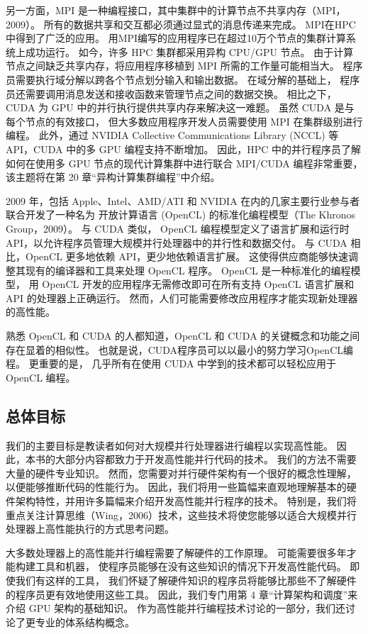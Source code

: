 另一方面，MPI 是一种编程接口，其中集群中的计算节点不共享内存（MPI，2009）。 
所有的数据共享和交互都必须通过显式的消息传递来完成。 MPI在HPC中得到了广泛的应用。 
用MPI编写的应用程序已在超过10万个节点的集群计算系统上成功运行。 如今，许多 HPC 集群都采用异构 CPU/GPU 节点。 
由于计算节点之间缺乏共享内存，将应用程序移植到 MPI 所需的工作量可能相当大。 
程序员需要执行域分解以跨各个节点划分输入和输出数据。 在域分解的基础上，
程序员还需要调用消息发送和接收函数来管理节点之间的数据交换。 相比之下，
CUDA 为 GPU 中的并行执行提供共享内存来解决这一难题。 虽然 CUDA 是与每个节点的有效接口，
但大多数应用程序开发人员需要使用 MPI 在集群级别进行编程。 
此外，通过 NVIDIA Collective Communications Library (NCCL) 等 API，CUDA 中的多 GPU 编程支持不断增加。 
因此，HPC 中的并行程序员了解如何在使用多 GPU 节点的现代计算集群中进行联合 MPI/CUDA 编程非常重要，
该主题将在第 20 章“异构计算集群编程”中介绍。

2009 年，包括 Apple、Intel、AMD/ATI 和 NVIDIA 在内的几家主要行业参与者联合开发了一种名为
开放计算语言 (OpenCL) 的标准化编程模型（The Khronos Group，2009）。 与 CUDA 类似，
OpenCL 编程模型定义了语言扩展和运行时 API，以允许程序员管理大规模并行处理器中的并行性和数据交付。 
与 CUDA 相比，OpenCL 更多地依赖 API，更少地依赖语言扩展。 
这使得供应商能够快速调整其现有的编译器和工具来处理 OpenCL 程序。 OpenCL 是一种标准化的编程模型，
用 OpenCL 开发的应用程序无需修改即可在所有支持 OpenCL 语言扩展和 API 的处理器上正确运行。 
然而，人们可能需要修改应用程序才能实现新处理器的高性能。

熟悉 OpenCL 和 CUDA 的人都知道，OpenCL 和 CUDA 的关键概念和功能之间存在显着的相似性。 
也就是说，CUDA程序员可以以最小的努力学习OpenCL编程。 更重要的是，
几乎所有在使用 CUDA 中学到的技术都可以轻松应用于 OpenCL 编程。

\subsection{总体目标}
我们的主要目标是教读者如何对大规模并行处理器进行编程以实现高性能。 
因此，本书的大部分内容都致力于开发高性能并行代码的技术。 我们的方法不需要大量的硬件专业知识。 
然而，您需要对并行硬件架构有一个很好的概念性理解，以便能够推断代码的性能行为。 
因此，我们将用一些篇幅来直观地理解基本的硬件架构特性，并用许多篇幅来介绍开发高性能并行程序的技术。 
特别是，我们将重点关注计算思维（Wing，2006）技术，这些技术将使您能够以适合大规模并行处理器上高性能执行的方式思考问题。

大多数处理器上的高性能并行编程需要了解硬件的工作原理。 可能需要很多年才能构建工具和机器，
使程序员能够在没有这些知识的情况下开发高性能代码。 即使我们有这样的工具，
我们怀疑了解硬件知识的程序员将能够比那些不了解硬件的程序员更有效地使用这些工具。 
因此，我们专门用第 4 章“计算架构和调度”来介绍 GPU 架构的基础知识。 
作为高性能并行编程技术讨论的一部分，我们还讨论了更专业的体系结构概念。

